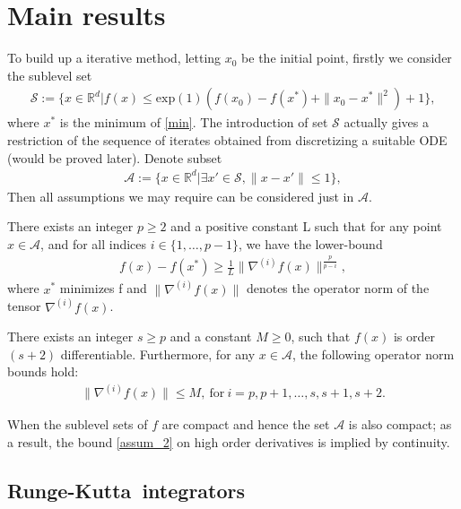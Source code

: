 \section{Main results}
To build up a iterative method, letting $x_{0}$ be the initial point, firstly we
consider the sublevel set
\begin{align}\label{sublevel_set}
  \mathcal{S} := \{ x \in \mathbb{R}^{d} | f(x) \leq \mathrm{exp}(1) (f(x_{0})
  - f(x^{*}) + \|x_{0} - x^{*}\|^{2}) + 1 \},
\end{align}
where $x^{*}$ is the minimum of \eqref{min}. The introduction of set $\mathcal{S}$
actually gives a restriction of the sequence of iterates obtained from
discretizing a suitable ODE (would be proved later). Denote subset
\begin{align}
  \mathcal{A} := \{ x \in \mathbb{R}^{d} | \exists x' \in \mathcal{S}, \|x-x'\| \leq 1 \},
\end{align}
Then all assumptions we may require can be considered just in $\mathcal{A}$.

\begin{assumption}
  There exists an integer $p \geq 2$ and a positive constant L such that for any point $x \in \mathcal{A}$, and for all indices $i \in \{1,\ldots,p-1\}$, we have the lower-bound
  \begin{align}\label{assum_1}
    f(x) - f(x^{*}) \geq \frac{1}{L} \| \nabla^{(i)}f(x) \|^{\frac{p}{p-i}},
  \end{align}
  where $x^{*}$ minimizes f and $\| \nabla^{(i)}f(x) \|$ denotes the operator norm of the tensor $\nabla^{(i)}f(x)$.
\end{assumption}

\begin{assumption}
  There exists an integer $s \geq p$ and a constant $M \geq 0$, such that $f(x)$ is order $(s+2)$ differentiable. Furthermore, for any $x \in \mathcal{A}$, the following operator norm bounds hold:
  \begin{align}\label{assum_2}
    \| \nabla^{(i)}f(x) \| \leq M,\ \text{for}\ i = p,p+1,\ldots,s,s+1,s+2.
  \end{align}
\end{assumption}

When the sublevel sets of $f$ are compact and hence the set $\mathcal{A}$ is also compact; as a result, the bound \eqref{assum_2} on high order derivatives is implied by continuity.

\subsection{Runge-Kutta\ integrators}

